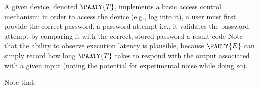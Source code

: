 %



A given device, denoted 
$\PARTY{T}$, 
implements a basic access control mechanism: in order to access the device
(e.g., log into it), 
a user must first provide the correct password.
{a password attempt}
{i.e., it validates the password attempt by comparing it with the correct, stored password}
{a result code}
Note that the ability to observe execution latency is plausible, because
$\PARTY{E}$ 
can simply record how long
$\PARTY{T}$ 
takes to respond with the output associated with a given input (noting the potential for experimental noise while doing so).




%
Note that:

